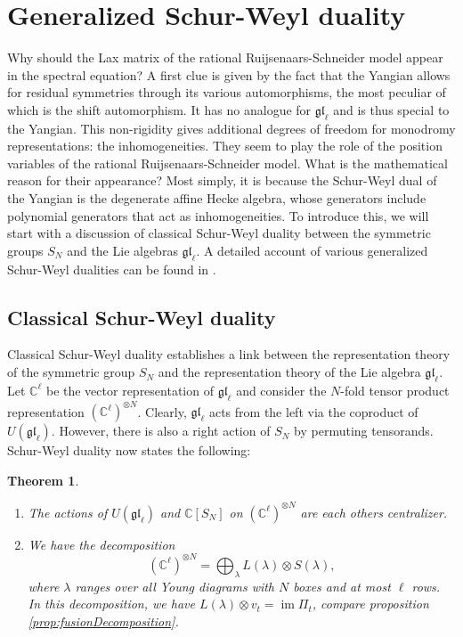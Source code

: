 \documentclass[11pt]{report}
\newtheorem{theorem}{Theorem}[section]
\theoremstyle{definition}
\theoremstyle{remark}
\theoremstyle{remark}
\newcommand{\C}{\mathbb{C}}
\begin{document}
\section{Generalized Schur-Weyl duality}

Why should the Lax matrix of the rational Ruijsenaars-Schneider model appear in the spectral equation? A first clue is given by the fact that the Yangian allows for residual symmetries through its various automorphisms, the most peculiar of which is the shift automorphism. It has no analogue for $\mathfrak{gl}_\ell$ and is thus special to the Yangian. This non-rigidity gives additional degrees of freedom for monodromy representations: the inhomogeneities. They seem to play the role of the position variables of the rational Ruijsenaars-Schneider model. What is the mathematical reason for their appearance? Most simply, it is because the Schur-Weyl dual of the Yangian is the degenerate affine Hecke algebra, whose generators include polynomial generators that act as inhomogeneities. To introduce this, we will start with a discussion of classical Schur-Weyl duality between the symmetric groups $S_N$ and the Lie algebras $\mathfrak{gl}_\ell$. A detailed account of various generalized Schur-Weyl dualities can be found in \cite{thesis:antor:2020}.

\subsection{Classical Schur-Weyl duality}

Classical Schur-Weyl duality establishes a link between the representation theory of the symmetric group $S_N$ and the representation theory of the Lie algebra $\mathfrak{gl}_\ell$. Let $\C^\ell$ be the vector representation of $\mathfrak{gl}_\ell$ and consider the $N$-fold tensor product representation $(\C^\ell)^{\otimes N}$. Clearly, $\mathfrak{gl}_\ell$ acts from the left via the coproduct of $U(\mathfrak{gl}_\ell)$. However, there is also a right action of $S_N$ by permuting tensorands. Schur-Weyl duality now states the following:

\begin{theorem}
\begin{enumerate}[label=(\roman*)]
\item The actions of $U(\mathfrak{gl}_\ell)$ and $\C[S_N]$ on $(\C^\ell)^{\otimes N}$ are each others centralizer.
\item We have the decomposition
\begin{equation*}
(\C^\ell)^{\otimes N} = \bigoplus_{\lambda} L(\lambda) \otimes S(\lambda),
\end{equation*}
where $\lambda$ ranges over all Young diagrams with $N$ boxes and at most $\ell$ rows. In this decomposition, we have $L(\lambda) \otimes v_t = \operatorname{im} \Pi_t$, compare proposition \ref{prop:fusionDecomposition}.
\end{enumerate}
\end{theorem}
\end{document}
